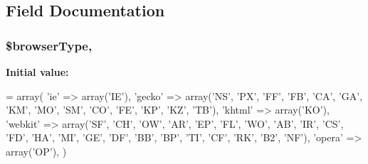 \subsection{Field Documentation}
\hypertarget{class_user_agent_parser_ad0821f30ee48c49356b114884ad1c552}{
\subsubsection[{\$browser\-Type}]{\setlength{\rightskip}{0pt plus 5cm}\$browser\-Type\hspace{0.3cm}{\ttfamily [static]}, {\ttfamily [protected]}}}\label{class_user_agent_parser_ad0821f30ee48c49356b114884ad1c552}
{\bfseries Initial value\-:}
\begin{DoxyCode}
= array(
        \textcolor{stringliteral}{'ie'}        => array(\textcolor{stringliteral}{'IE'}),
        \textcolor{stringliteral}{'gecko'}     => array(\textcolor{stringliteral}{'NS'}, \textcolor{stringliteral}{'PX'}, \textcolor{stringliteral}{'FF'}, \textcolor{stringliteral}{'FB'}, \textcolor{stringliteral}{'CA'}, \textcolor{stringliteral}{'GA'}, \textcolor{stringliteral}{'KM'}, \textcolor{stringliteral}{'MO'}, \textcolor{stringliteral}{'SM'}, \textcolor{stringliteral}{'CO'}, \textcolor{stringliteral}{'FE'}, \textcolor{stringliteral}{'KP'}, \textcolor{stringliteral}{'KZ'}, \textcolor{stringliteral}{
      'TB'}),
        \textcolor{stringliteral}{'khtml'}     => array(\textcolor{stringliteral}{'KO'}),
        \textcolor{stringliteral}{'webkit'}    => array(\textcolor{stringliteral}{'SF'}, \textcolor{stringliteral}{'CH'}, \textcolor{stringliteral}{'OW'}, \textcolor{stringliteral}{'AR'}, \textcolor{stringliteral}{'EP'}, \textcolor{stringliteral}{'FL'}, \textcolor{stringliteral}{'WO'}, \textcolor{stringliteral}{'AB'}, \textcolor{stringliteral}{'IR'}, \textcolor{stringliteral}{'CS'}, \textcolor{stringliteral}{'FD'}, \textcolor{stringliteral}{'HA'}, \textcolor{stringliteral}{'MI'}, \textcolor{stringliteral}{
      'GE'}, \textcolor{stringliteral}{'DF'}, \textcolor{stringliteral}{'BB'}, \textcolor{stringliteral}{'BP'}, \textcolor{stringliteral}{'TI'}, \textcolor{stringliteral}{'CF'}, \textcolor{stringliteral}{'RK'}, \textcolor{stringliteral}{'B2'}, \textcolor{stringliteral}{'NF'}),
        \textcolor{stringliteral}{'opera'}     => array(\textcolor{stringliteral}{'OP'}),
    )
\end{DoxyCode}


